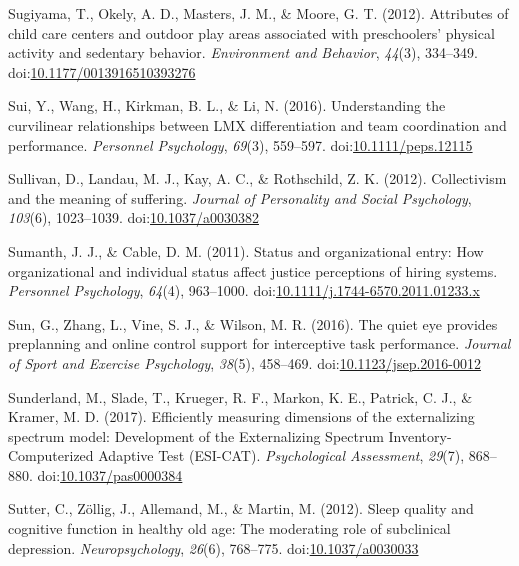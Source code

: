 \documentclass[english,man]{apa6}
\theoremstyle{definition}
\theoremstyle{definition}
\theoremstyle{definition}
\theoremstyle{remark}
\begin{document}
\hypertarget{ref-Sugiyama2012}{}
Sugiyama, T., Okely, A. D., Masters, J. M., \& Moore, G. T. (2012).
Attributes of child care centers and outdoor play areas associated with
preschoolers' physical activity and sedentary behavior.
\emph{Environment and Behavior}, \emph{44}(3), 334--349.
doi:\href{https://doi.org/10.1177/0013916510393276}{10.1177/0013916510393276}

\hypertarget{ref-Sui2016}{}
Sui, Y., Wang, H., Kirkman, B. L., \& Li, N. (2016). Understanding the
curvilinear relationships between LMX differentiation and team
coordination and performance. \emph{Personnel Psychology}, \emph{69}(3),
559--597.
doi:\href{https://doi.org/10.1111/peps.12115}{10.1111/peps.12115}

\hypertarget{ref-Sullivan2012}{}
Sullivan, D., Landau, M. J., Kay, A. C., \& Rothschild, Z. K. (2012).
Collectivism and the meaning of suffering. \emph{Journal of Personality
and Social Psychology}, \emph{103}(6), 1023--1039.
doi:\href{https://doi.org/10.1037/a0030382}{10.1037/a0030382}

\hypertarget{ref-Sumanth2011}{}
Sumanth, J. J., \& Cable, D. M. (2011). Status and organizational entry:
How organizational and individual status affect justice perceptions of
hiring systems. \emph{Personnel Psychology}, \emph{64}(4), 963--1000.
doi:\href{https://doi.org/10.1111/j.1744-6570.2011.01233.x}{10.1111/j.1744-6570.2011.01233.x}

\hypertarget{ref-Sun2016}{}
Sun, G., Zhang, L., Vine, S. J., \& Wilson, M. R. (2016). The quiet eye
provides preplanning and online control support for interceptive task
performance. \emph{Journal of Sport and Exercise Psychology},
\emph{38}(5), 458--469.
doi:\href{https://doi.org/10.1123/jsep.2016-0012}{10.1123/jsep.2016-0012}

\hypertarget{ref-Sunderland2017}{}
Sunderland, M., Slade, T., Krueger, R. F., Markon, K. E., Patrick, C.
J., \& Kramer, M. D. (2017). Efficiently measuring dimensions of the
externalizing spectrum model: Development of the Externalizing Spectrum
Inventory-Computerized Adaptive Test (ESI-CAT). \emph{Psychological
Assessment}, \emph{29}(7), 868--880.
doi:\href{https://doi.org/10.1037/pas0000384}{10.1037/pas0000384}

\hypertarget{ref-Sutter2012}{}
Sutter, C., Zöllig, J., Allemand, M., \& Martin, M. (2012). Sleep
quality and cognitive function in healthy old age: The moderating role
of subclinical depression. \emph{Neuropsychology}, \emph{26}(6),
768--775. doi:\href{https://doi.org/10.1037/a0030033}{10.1037/a0030033}
\end{document}
